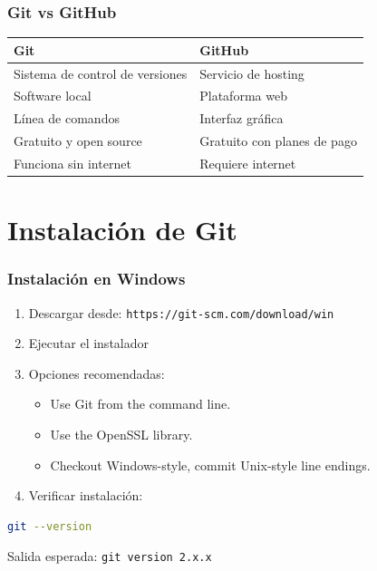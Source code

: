 \documentclass[aspectratio=169]{beamer}
\begin{document}
\begin{frame}
\frametitle{Git vs GitHub}
\begin{center}
\begin{tabular}{|p{5cm}|p{5cm}|}
\hline
\textbf{Git} & \textbf{GitHub} \\
\hline
Sistema de control de versiones & Servicio de hosting \\
\hline
Software local & Plataforma web \\
\hline
Línea de comandos & Interfaz gráfica \\
\hline
Gratuito y open source & Gratuito con planes de pago \\
\hline
Funciona sin internet & Requiere internet \\
\hline
\end{tabular}
\end{center}
\end{frame}

\section{Instalación de Git}
\begin{frame}[fragile]
\frametitle{Instalación en Windows}
\begin{enumerate}
    \item Descargar desde: \texttt{https://git-scm.com/download/win}
    \item Ejecutar el instalador
    \item Opciones recomendadas:
    \begin{itemize}
        \item Use Git from the command line.
        \item Use the OpenSSL library.
        \item Checkout Windows-style, commit Unix-style line endings.
    \end{itemize}
    \item Verificar instalación:
\end{enumerate}

\begin{lstlisting}[language=bash, caption=Verificar versión de Git]
git --version
\end{lstlisting}

Salida esperada: \texttt{git version 2.x.x}
\end{frame}
\end{document}
